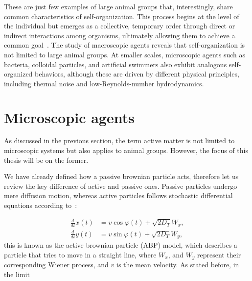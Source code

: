 These are just few examples of large animal groups that, interestingly, share common characteristics of self-organization. This process begins at the level of the individual but emerges as a collective, temporary order through direct or indirect interactions among organisms, ultimately allowing them to achieve a common goal~\cite{isaeva2012self}.
The study of macroscopic agents reveals that self-organization is not limited to large animal groups. At smaller scales, microscopic agents such as bacteria, colloidal particles, and artificial swimmers also exhibit analogous self-organized behaviors, although these are driven by different physical principles, including thermal noise and low-Reynolds-number hydrodynamics.

\section{Microscopic agents}

As discussed in the previous section, the term active matter is not limited to microscopic systems but also applies to animal groups. However, the focus of this thesis will be on the former.

We have already defined how a passive brownian particle acts, therefore let us review the key difference of active and passive ones. Passive particles undergo mere diffusion motion, whereas active particles follows stochastic differential equations according to~\cite{volpe2014simulation}: 

\begin{align}
  \frac{d}{dt}x(t) &= v\cos{\varphi(t)} + \sqrt{2D_T}W_x,\\
  \frac{d}{dt}y(t) &= v\sin{\varphi(t)} + \sqrt{2D_T}W_y,
  \label{eq:activestochasticequation}
\end{align}
this is known as the active brownian particle (ABP) model, which describes a particle that tries to move in a straight line, where $W_x$, and $W_y$ represent their corresponding Wiener process, and $v$ is the mean velocity. As stated before, in the limit 

